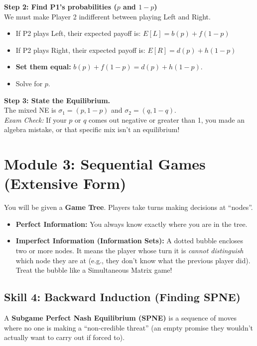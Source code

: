 \documentclass[12pt, a4paper]{article}
\begin{document}
\textbf{Step 2: Find P1's probabilities ($p$ and $1-p$)} \\
We must make Player 2 indifferent between playing Left and Right.
\begin{itemize}
    \item If P2 plays Left, their expected payoff is: $E[L] = b(p) + f(1-p)$
    \item If P2 plays Right, their expected payoff is: $E[R] = d(p) + h(1-p)$
    \item \textbf{Set them equal:} $b(p) + f(1-p) = d(p) + h(1-p)$.
    \item Solve for $p$.
\end{itemize}

\textbf{Step 3: State the Equilibrium.} \\
The mixed NE is $\sigma_1 = (p, 1-p)$ and $\sigma_2 = (q, 1-q)$. \\
\textit{Exam Check:} If your $p$ or $q$ comes out negative or greater than 1, you made an algebra mistake, or that specific mix isn't an equilibrium!

\section{Module 3: Sequential Games (Extensive Form)}

You will be given a \textbf{Game Tree}. Players take turns making decisions at ``nodes''.
\begin{itemize}
    \item \textbf{Perfect Information:} You always know exactly where you are in the tree.
    \item \textbf{Imperfect Information (Information Sets):} A dotted bubble encloses two or more nodes. It means the player whose turn it is \textit{cannot distinguish} which node they are at (e.g., they don't know what the previous player did). Treat the bubble like a Simultaneous Matrix game!
\end{itemize}

\subsection{Skill 4: Backward Induction (Finding SPNE)}
A \textbf{Subgame Perfect Nash Equilibrium (SPNE)} is a sequence of moves where no one is making a ``non-credible threat'' (an empty promise they wouldn't actually want to carry out if forced to).
\end{document}
